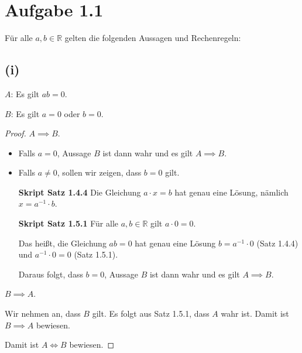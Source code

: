 \documentclass[12pt]{extarticle}
\begin{document}
\section*{Aufgabe 1.1} Für alle \(a, b \in \mathbb{R}\) gelten die
folgenden Aussagen und Rechenregeln:
\subsection*{(i)} \(A\): Es gilt \(ab = 0\).

\(B\): Es gilt \(a = 0\) oder \(b = 0\).

\begin{proof}
\(A \implies B\).
    \begin{itemize}
    \item Falls \(a = 0\), Aussage \(B\) ist dann wahr und es gilt $A
\implies B$.
    \item Falls \(a \neq 0\), sollen wir zeigen, dass \(b = 0\) gilt.

\textbf{Skript Satz 1.4.4} Die Gleichung \(a \cdot x = b\) hat genau
eine Lösung, nämlich \(x = a^{-1} \cdot b\).

\textbf{Skript Satz 1.5.1} Für alle \(a,b \in \mathbb{R}\) gilt $a \cdot
0 = 0$.

Das heißt, die Gleichung \(ab=0\) hat genau eine Lösung $b=a^{-1} \cdot
0$ (Satz 1.4.4) und \(a^{-1} \cdot 0 = 0\) (Satz 1.5.1).

Daraus folgt, dass \(b = 0\), Aussage \(B\) ist dann wahr und es gilt
\(A \implies B\).
    \end{itemize}
\(B \implies A\).

  Wir nehmen an, dass \(B\) gilt.  Es folgt aus Satz 1.5.1, dass \(A\)
  wahr ist.  Damit ist \(B \implies A\) bewiesen.

Damit ist \( A \Leftrightarrow B\) bewiesen.

\end{proof}
\end{document}
